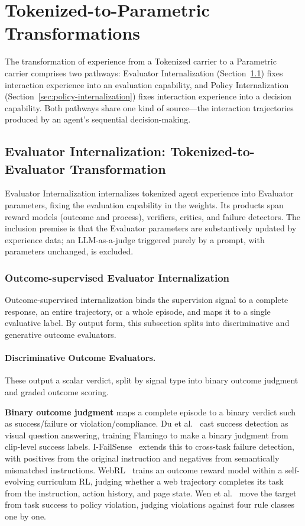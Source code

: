 \section{Tokenized-to-Parametric Transformations}
\label{sec:tok2param}

The transformation of experience from a Tokenized carrier to a Parametric carrier comprises two pathways: Evaluator Internalization (Section~\ref{sec:evaluator-internalization}) fixes interaction experience into an evaluation capability, and Policy Internalization (Section~\ref{sec:policy-internalization}) fixes interaction experience into a decision capability. Both pathways share one kind of source---the interaction trajectories produced by an agent's sequential decision-making.

\subsection{Evaluator Internalization: Tokenized-to-Evaluator Transformation}
\label{sec:evaluator-internalization}

Evaluator Internalization internalizes tokenized agent experience into Evaluator parameters, fixing the evaluation capability in the weights. Its products span reward models (outcome and process), verifiers, critics, and failure detectors. The inclusion premise is that the Evaluator parameters are substantively updated by experience data; an LLM-as-a-judge triggered purely by a prompt, with parameters unchanged, is excluded.

\subsubsection{Outcome-supervised Evaluator Internalization}

Outcome-supervised internalization binds the supervision signal to a complete response, an entire trajectory, or a whole episode, and maps it to a single evaluative label. By output form, this subsection splits into discriminative and generative outcome evaluators.

\paragraph{Discriminative Outcome Evaluators.} These output a scalar verdict, split by signal type into binary outcome judgment and graded outcome scoring.

\textbf{Binary outcome judgment} maps a complete episode to a binary verdict such as success/failure or violation/compliance. Du et al.~\cite{Du23} cast success detection as visual question answering, training Flamingo to make a binary judgment from clip-level success labels. I-FailSense~\cite{Gri25} extends this to cross-task failure detection, with positives from the original instruction and negatives from semantically mismatched instructions. WebRL~\cite{Qi24} trains an outcome reward model within a self-evolving curriculum RL, judging whether a web trajectory completes its task from the instruction, action history, and page state. Wen et al.~\cite{Wen25b} move the target from task success to policy violation, judging violations against four rule classes one by one.

